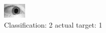 \begin{figure}[h!]
\begin{center}
\includegraphics[width=0.60\columnwidth]{figures/ID1555_class_2_target_1.png}
\end{center}
\caption{ Classification: 2 actual target: 1}
\label{fig:ID1555_class_2_target_1}
\end{figure}

